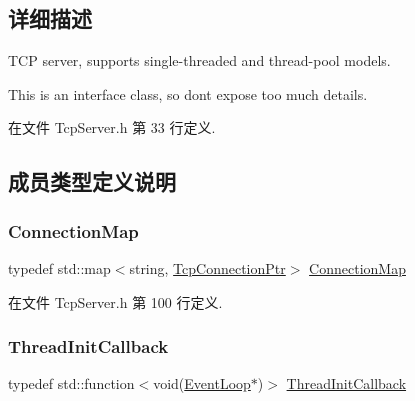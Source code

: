 \subsection{详细描述}
T\+CP server, supports single-\/threaded and thread-\/pool models.

This is an interface class, so don\textquotesingle{}t expose too much details. 

在文件 Tcp\+Server.\+h 第 33 行定义.



\subsection{成员类型定义说明}
\mbox{\label{classmuduo_1_1net_1_1TcpServer_a2c3bfe5c78908785dcee50683b157116}} 
\subsubsection{\texorpdfstring{Connection\+Map}{ConnectionMap}}
{\footnotesize\ttfamily typedef std\+::map$<$string, \hyperlink{namespacemuduo_1_1net_ab91a46e9290926aa692450e46cfc9039}{Tcp\+Connection\+Ptr}$>$ \hyperlink{classmuduo_1_1net_1_1TcpServer_a2c3bfe5c78908785dcee50683b157116}{Connection\+Map}\hspace{0.3cm}{\ttfamily [private]}}



在文件 Tcp\+Server.\+h 第 100 行定义.

\mbox{\label{classmuduo_1_1net_1_1TcpServer_a4665880f4633f1e7d95fd6fef6811717}} 
\subsubsection{\texorpdfstring{Thread\+Init\+Callback}{ThreadInitCallback}}
{\footnotesize\ttfamily typedef std\+::function$<$void(\hyperlink{classmuduo_1_1net_1_1EventLoop}{Event\+Loop}$\ast$)$>$ \hyperlink{classmuduo_1_1net_1_1TcpServer_a4665880f4633f1e7d95fd6fef6811717}{Thread\+Init\+Callback}}



